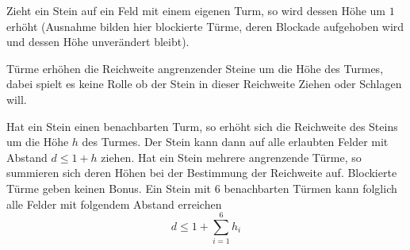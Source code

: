 Zieht ein Stein auf ein Feld mit einem eigenen Turm, so wird dessen Höhe um $1$ erhöht (Ausnahme bilden hier blockierte Türme, deren Blockade aufgehoben wird und dessen Höhe unverändert bleibt).

Türme erhöhen die Reichweite angrenzender Steine um die Höhe des Turmes, dabei spielt es keine Rolle ob der Stein in dieser Reichweite Ziehen oder Schlagen will.

Hat ein Stein einen benachbarten Turm, so erhöht sich die Reichweite des Steins um die Höhe $h$ des Turmes. Der Stein kann dann auf alle erlaubten Felder mit Abstand $d \le 1 + h$ ziehen. Hat ein Stein mehrere angrenzende Türme, so summieren sich deren Höhen bei der Bestimmung der Reichweite auf. Blockierte Türme geben keinen Bonus. Ein Stein mit $6$ benachbarten Türmen kann folglich alle Felder mit folgendem Abstand erreichen \[d \le 1 + \sum_{i=1}^6 h_i\]

